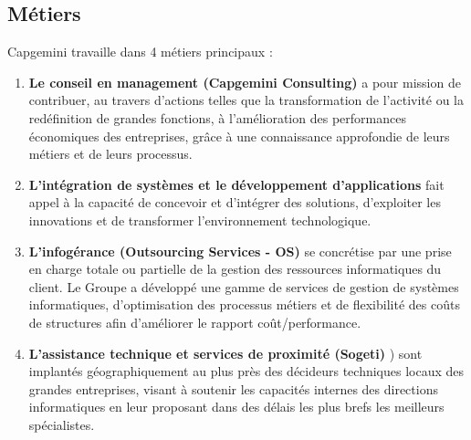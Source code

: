 \subsection{Métiers}
Capgemini travaille dans 4 métiers principaux :
\\
\begin{enumerate}
\item \textbf{Le conseil en management (Capgemini Consulting)} a pour mission de contribuer, au travers d’actions telles que la transformation de l’activité ou la redéfinition de grandes fonctions, à l’amélioration des performances économiques des entreprises, grâce à une connaissance approfondie de leurs métiers et de leurs processus.
\item \textbf{L'intégration de systèmes et le développement d'applications} fait appel à la capacité de concevoir et d’intégrer des solutions, d’exploiter les innovations et de transformer l’environnement technologique.
\item \textbf{L’infogérance (Outsourcing Services - OS)} se concrétise par une prise en charge totale ou partielle de la gestion des ressources informatiques du client. Le Groupe a développé une gamme de services de gestion de systèmes informatiques, d’optimisation des processus métiers et de flexibilité des coûts de structures afin d’améliorer le rapport coût/performance.
\item \textbf{L'assistance technique et services de proximité (Sogeti)} ) sont implantés géographiquement au plus près des décideurs techniques locaux des grandes entreprises, visant à soutenir les capacités internes des directions informatiques en leur proposant dans des délais les plus brefs les meilleurs spécialistes.
\end{enumerate}
\begin{figure}[h]
\end{figure}
